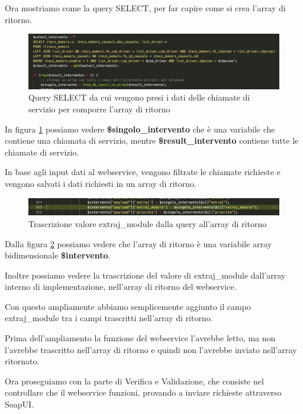 \newpage

\newspace
\begin{flushleft}
	Ora mostriamo come la query SELECT, per far capire come si crea l'array di ritorno.
\end{flushleft}

\begin{figure}[!h] 
	\centering
	\includegraphics[scale = 0.4]{immagini/webservices/ampliamenti/3ampl__nontoccata_query_select.png}
	\caption{Query SELECT da cui vengono presi i dati delle chiamate di servizio per comporre l'array di ritorno}
	\label{fig:5-9}
\end{figure}
\newspace
In figura \ref{fig:5-9} possiamo vedere \textbf{\$singolo\_intervento} che è una variabile che contiene una chiamata di servizio, mentre \textbf{\$result\_intervento} contiene tutte le chiamate di servizio.

In base agli input dati al webservice, vengono filtrate le chiamate richieste e vengono salvati i dati richiesti in un array di ritorno.
\newspace
\begin{figure}[!h] 
	\centering
	\includegraphics[scale = 0.5]{immagini/webservices/ampliamenti/3ampl__correzione_functionmokers.png}
	\caption{Trascrizione valore extraj\_module dalla query all'array di ritorno}
	\label{fig:5-10}
\end{figure}
\newspace

\begin{flushleft}
	Dalla figura \ref{fig:5-10} possiamo vedere che l'array di ritorno è una variabile array bidimensionale \textbf{\$intervento}.
	\newspace
	
	Inoltre possiamo vedere la trascrizione del valore di extraj\_module dall'array interno di implementazione, nell'array di ritorno del webservice.
	
	Con questo ampliamente abbiamo semplicemente aggiunto il campo extraj\_module tra i campi trascritti nell'array di ritorno.
	
	Prima dell'ampliamento la funzione del webservice l'avrebbe letto, ma non l'avrebbe trascritto nell'array di ritorno e quindi non l'avrebbe inviato nell'array ritornato.
	\newspace
	
	Ora proseguiamo con la parte di Verifica e Validazione, che consiste nel controllare che il webservice funzioni, provando a inviare richieste attraverso SoapUI.
\end{flushleft}
\newspace

